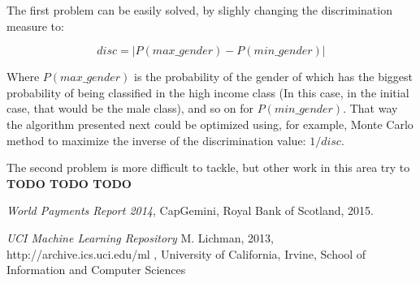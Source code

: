 \documentclass[paper=a4, fontsize=11pt]{scrartcl} %
\numberwithin{equation}{section} %
\numberwithin{figure}{section} %
\numberwithin{table}{section} %
\begin{document}
The first problem can be easily solved, by slighly changing the discrimination measure to:

$$ disc = | P(max\_gender) - P(min\_gender) |$$

Where $P(max\_gender)$ is the probability of the gender of which has the biggest probability of being classified in the high income class (In this case, in the initial case, that would be the male class), and so on for $P(min\_gender) $. That way the algorithm presented next could be optimized using, for example, Monte Carlo method to maximize the inverse of the discrimination value: $1/disc$.

The second problem is more difficult to tackle, but other work in this area try to \textbf{TODO TODO TODO}

\begin{thebibliography}{9} 

 \emph{World Payments Report 2014}, CapGemini, Royal Bank of Scotland, 2015.

 \emph{{UCI} Machine Learning Repository}
M. Lichman, 2013, http://archive.ics.uci.edu/ml , University of California, Irvine, School of Information and Computer Sciences


\end{thebibliography}
\end{document}
